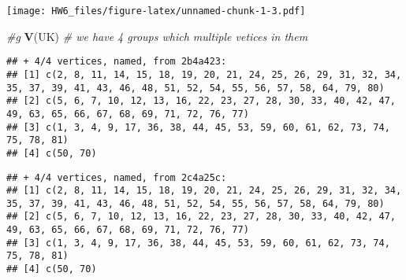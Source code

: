 \documentclass[
]{article}
\newenvironment{Shaded}{\begin{snugshade}}{\end{snugshade}}
\newcommand{\CommentTok}[1]{\textcolor[rgb]{0.56,0.35,0.01}{\textit{#1}}}
\newcommand{\DecValTok}[1]{\textcolor[rgb]{0.00,0.00,0.81}{#1}}
\newcommand{\KeywordTok}[1]{\textcolor[rgb]{0.13,0.29,0.53}{\textbf{#1}}}
\newcommand{\NormalTok}[1]{#1}
\newcommand{\OperatorTok}[1]{\textcolor[rgb]{0.81,0.36,0.00}{\textbf{#1}}}
\newcommand{\StringTok}[1]{\textcolor[rgb]{0.31,0.60,0.02}{#1}}
\begin{document}
\texttt{[image: HW6\_files/figure-latex/unnamed-chunk-1-3.pdf]}

\begin{Shaded}
\begin{Highlighting}[]
\CommentTok{#g}
\KeywordTok{V}\NormalTok{(UK) }\CommentTok{# we have 4 groups which multiple vetices in them}
\end{Highlighting}
\end{Shaded}

\begin{verbatim}
## + 4/4 vertices, named, from 2b4a423:
## [1] c(2, 8, 11, 14, 15, 18, 19, 20, 21, 24, 25, 26, 29, 31, 32, 34, 35, 37, 39, 41, 43, 46, 48, 51, 52, 54, 55, 56, 57, 58, 64, 79, 80)
## [2] c(5, 6, 7, 10, 12, 13, 16, 22, 23, 27, 28, 30, 33, 40, 42, 47, 49, 63, 65, 66, 67, 68, 69, 71, 72, 76, 77)                         
## [3] c(1, 3, 4, 9, 17, 36, 38, 44, 45, 53, 59, 60, 61, 62, 73, 74, 75, 78, 81)                                                          
## [4] c(50, 70)
\end{verbatim}

\begin{Shaded}
\end{Shaded}

\begin{verbatim}
## + 4/4 vertices, named, from 2c4a25c:
## [1] c(2, 8, 11, 14, 15, 18, 19, 20, 21, 24, 25, 26, 29, 31, 32, 34, 35, 37, 39, 41, 43, 46, 48, 51, 52, 54, 55, 56, 57, 58, 64, 79, 80)
## [2] c(5, 6, 7, 10, 12, 13, 16, 22, 23, 27, 28, 30, 33, 40, 42, 47, 49, 63, 65, 66, 67, 68, 69, 71, 72, 76, 77)                         
## [3] c(1, 3, 4, 9, 17, 36, 38, 44, 45, 53, 59, 60, 61, 62, 73, 74, 75, 78, 81)                                                          
## [4] c(50, 70)
\end{verbatim}

\begin{Shaded}
\end{Shaded}
\end{document}
